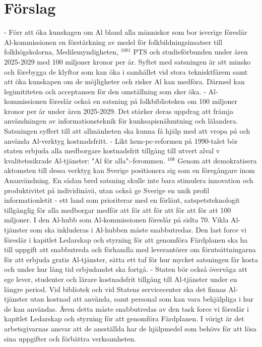 {{{{{{{{{{{{{{{{\section*{Förslag}
- Förr att öka kunskagen om Al bland alla människor som bor isverige föreslår Al-kommissionen en förstärkning av medel för folkbildningsinsatser till folkhögskolorna, Medilemyndigheten, \({ }^{1081}\) PTS och studieförbunden under åren 2025-2029 med 100 miljoner kronor per år. Syftet med satsningen är att minsko och förebygga de klyftor som kan öka i samhället vid stora teknisktfärem samt att öka kunskapen om de möjligheter och risker Al kan medföra. Därmed kan legimititeten och acceptansen för den omställning som sker öka.
- Al-kommissionen föreslår också en satsning på folkbiblioteken om 100 miljoner kronor per år under åren 2025-2029. Det stärker deras uppdrag att främja användningen av informationsteknik för kunksapisnähmtning och lälandera. Satsningen syffert till att allmänheten ska kunna få hjälp med att vropa på och använda Al-verktyg kostnadsfritt.
- Likt hem-pc-reformen på 1990-talet bör staten erbjuda alla medborgare kostnadsfrit tillgång till utvert alval v kvalitetssikrade Al-tjänster: "Al för alla":-ferommen. \({ }^{108}\) Genom att demokratisera aktomsten till dessa verktyg kan Sverige positionera sig som en föregångare inom Ananvändning. En sådan bred satsning skulle inte bara stimulera innovation och produktivitet på individinåvä, utan också ge Sverige en unik profil informationletit - ett land som prioriterar med en förläut, satspetsteknologit tillgänglig för alla medborgar medför att för att för att för att för att 100 miljoner. I den Al-hubb som Al-kommissionen föreslår på sidta 70. Vikla Al-tjänster som ska inkluderas i Al-hubben måste snabbutredas. Den last force vi föreslär i kapitlet Ledarskap och styrning för att genomföra Färdplanen ska ha till uppgift att snabbutreda och förhandla med leverantörer om förutsättningarna för att erbjuda gratis Al-tjänster, sätta ett taf för hur mycket satsningen får kosta och under hur lång tid erbjudandet ska fortgå.
- Staten bör också överväga att ege lever, studenter och lärare kostnadsfrit tillgång till Al-tjänster under en längre period. Vid bibliotek och vid Statens servicecenter ska det finnas Al-tjänster utan kostnad att använda, samt personal som kan vara behjälpliga i hur de kan användas. Även detta måste snabbutredas av den task force vi föreslär i kapitlet Ledarskap och styrning för att genomföra Färdplanen. I vörigt är det arbetsgivarnas ansvar att de ansställda har de hjälpmedel som behövs för att lösa sina uppgifter och förbättra verksamheten.
}}}}}}}}}}}}}}}}
